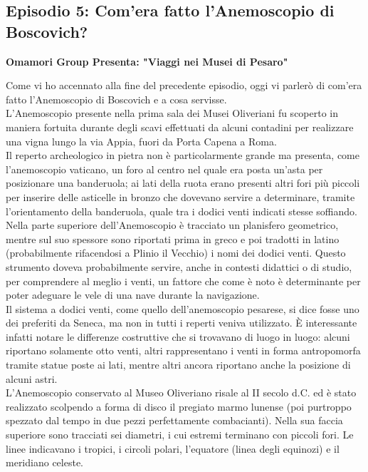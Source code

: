 \documentclass[hidelinks,12pt,a4paper]{article}
\begin{document}
\begin{flushleft}
		\subsection{Episodio 5: Com'era fatto l'Anemoscopio di Boscovich?}
		\begin{center}
			\textbf{Omamori Group Presenta: "Viaggi nei Musei di Pesaro"}
		\end{center}
		Come vi ho accennato alla fine del precedente episodio, oggi vi parlerò di com'era fatto l'Anemoscopio di Boscovich e a cosa servisse.\\
		L'Anemoscopio presente nella prima sala dei Musei Oliveriani fu scoperto in maniera fortuita durante degli scavi effettuati da alcuni contadini per realizzare una vigna lungo la via Appia, fuori da Porta Capena a Roma.\\
		Il reperto archeologico in pietra non è particolarmente grande ma presenta, come l'anemoscopio vaticano, un foro al centro nel quale era posta un'asta per posizionare una banderuola; ai lati della ruota erano presenti altri fori più piccoli per inserire delle asticelle in bronzo che dovevano servire a determinare, tramite l'orientamento della banderuola, quale tra i dodici venti indicati stesse soffiando.\\
		Nella parte superiore dell'Anemoscopio è tracciato un planisfero geometrico, mentre sul suo spessore sono riportati prima in greco e poi tradotti in latino (probabilmente rifacendosi a Plinio il Vecchio) i nomi dei dodici venti. Questo strumento doveva probabilmente servire, anche in contesti didattici o di studio, per comprendere al meglio i venti, un fattore che come è noto è determinante per poter adeguare le vele di una nave durante la navigazione.\\
		Il sistema a dodici venti, come quello dell'anemoscopio pesarese, si dice fosse uno dei preferiti da Seneca, ma non in tutti i reperti veniva utilizzato. È interessante infatti notare le differenze costruttive che si trovavano di luogo in luogo: alcuni riportano solamente otto venti, altri rappresentano i venti in forma antropomorfa tramite statue poste ai lati, mentre altri ancora riportano anche la posizione di alcuni astri.\\
		L'Anemoscopio conservato al Museo Oliveriano risale al II secolo d.C. ed è stato realizzato scolpendo a forma di disco il pregiato marmo lunense (poi purtroppo spezzato dal tempo in due pezzi perfettamente combacianti). Nella sua faccia superiore sono tracciati sei diametri, i cui estremi terminano con piccoli fori. Le linee indicavano i tropici, i circoli polari, l'equatore (linea degli equinozi) e il meridiano celeste.\\

\end{flushleft}
\end{document}
